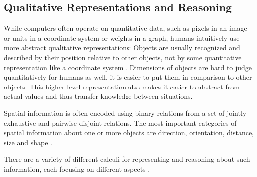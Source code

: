\subsection{Qualitative Representations and Reasoning}
While computers often operate on quantitative data, such as pixels in an image or units in a coordinate system or weights in a graph, humans intuitively use more abstract qualitative representations: Objects are usually recognized and described by their position relative to other objects, not by some quantitative representation like a coordinate system \cite{forbus2019qualitative,human-qual-unknown}.
Dimensions of objects are hard to judge quantitatively for humans as well, it is easier to put them in comparison to other objects. This higher level representation also makes it easier to abstract from actual values and thus transfer knowledge between situations.

Spatial information is often encoded using binary relations from a set of jointly exhaustive and pairwise disjoint relations. The most important categories of spatial information about one or more objects are direction, orientation, distance, size and shape \cite{Cohn2008QualitativeSR}.

There are a variety of different calculi for representing and reasoning about such information, each focusing on different aspects \cite{survey-https://doi.org/10.48550/arxiv.1606.00133}.


